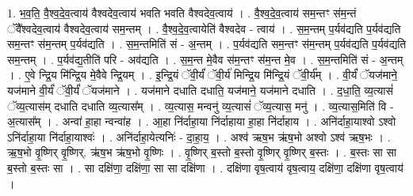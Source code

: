 \documentclass[17pt]{extarticle}
\begin{document}
1. भ॒व॒ति॒ वै॒श्व॒दे॒व॒त्वाय॑ वैश्वदेव॒त्वाय॑ भवति भवति वैश्वदेव॒त्वाय॑ । . वै॒श्व॒दे॒व॒त्वाय॑ सम॒न्तꣳ स॑म॒न्तं ॅवै᳚श्वदेव॒त्वाय॑ वैश्वदेव॒त्वाय॑ सम॒न्तम् । . वै॒श्व॒दे॒व॒त्वायेति॑ वैश्वदेव - त्वाय॑ । . स॒म॒न्तम् प॒र्यव॑द्यति प॒र्यव॑द्यति सम॒न्तꣳ स॑म॒न्तम् प॒र्यव॑द्यति । . स॒म॒न्तमिति॑ सं - अ॒न्तम् । . प॒र्यव॑द्यति सम॒न्तꣳ स॑म॒न्तम् प॒र्यव॑द्यति प॒र्यव॑द्यति सम॒न्तम् । . प॒र्यव॑द्य॒तीति॑ परि - अव॑द्यति । . स॒म॒न्त मे॒वैव स॑म॒न्तꣳ स॑म॒न्त मे॒व । . स॒म॒न्तमिति॑ सं - अ॒न्तम् । . ए॒वे न्द्रि॒य मि॑न्द्रि॒य मे॒वैवे न्द्रि॒यम् । . इ॒न्द्रि॒यं ॅवी॒र्यं॑ ॅवी॒र्य॑ मिन्द्रि॒य मि॑न्द्रि॒यं ॅवी॒र्य᳚म् । . वी॒र्यं॑ ॅयज॑माने॒ यज॑माने वी॒र्यं॑ ॅवी॒र्यं॑ ॅयज॑माने । . यज॑माने दधाति दधाति॒ यज॑माने॒ यज॑माने दधाति । . द॒धा॒ति॒ व्य॒त्यासं॑ ॅव्य॒त्यास॑म् दधाति दधाति व्य॒त्यास᳚म् । . व्य॒त्यास॒ मन्वनु॑ व्य॒त्यासं॑ ॅव्य॒त्यास॒ मनु॑ । . व्य॒त्यास॒मिति॑ वि - अ॒त्यास᳚म् । . अन्वा॑ हा॒हा न्वन्वा॑ह । . आ॒हा नि॑र्दाहा॒या नि॑र्दाहाया हा॒हा नि॑र्दाहाय । . अनि॑र्दाहा॒याश्वो ऽश्वो ऽनि॑र्दाहा॒या नि॑र्दाहा॒याश्वः॑ । . अनि॑र्दाहा॒येत्यनिः॑ - दा॒हा॒य॒ । . अश्व॑ ऋष॒भ ऋ॑ष॒भो अश्वो ऽश्व॑ ऋष॒भः । . ऋ॒ष॒भो वृ॒ष्णिर् वृ॒ष्णिर्. ऋ॑ष॒भ ऋ॑ष॒भो वृ॒ष्णिः । . वृ॒ष्णिर् ब॒स्तो ब॒स्तो वृ॒ष्णिर् वृ॒ष्णिर् ब॒स्तः । . ब॒स्तः सा सा ब॒स्तो ब॒स्तः सा । . सा दक्षि॑णा॒ दक्षि॑णा॒ सा सा दक्षि॑णा । . दक्षि॑णा वृष॒त्वाय॑ वृष॒त्वाय॒ दक्षि॑णा॒ दक्षि॑णा वृष॒त्वाय॑ । \newline
\end{document}
